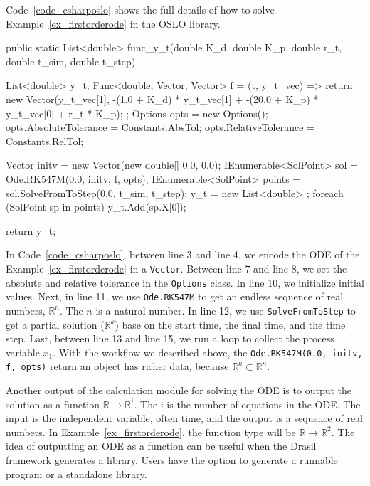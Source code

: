 Code~\ref{code_csharposlo} shows the full details of how to solve Example~\ref{ex_firstorderode} in the OSLO library.
\begin{listing}[ht]
\begin{csharp1}
public static List<double> func_y_t(double K_d, double K_p, double r_t, double t_sim, double t_step) {
    List<double> y_t;
    Func<double, Vector, Vector> f = (t, y_t_vec) => {
        return new Vector(y_t_vec[1], -(1.0 + K_d) * y_t_vec[1] + -(20.0 + K_p) * y_t_vec[0] + r_t * K_p);
    };
    Options opts = new Options();
    opts.AbsoluteTolerance = Constants.AbsTol;
    opts.RelativeTolerance = Constants.RelTol;
    
    Vector initv = new Vector(new double[] {0.0, 0.0});
    IEnumerable<SolPoint> sol = Ode.RK547M(0.0, initv, f, opts);
    IEnumerable<SolPoint> points = sol.SolveFromToStep(0.0, t_sim, t_step);
    y_t = new List<double> {};
    foreach (SolPoint sp in points) {
        y_t.Add(sp.X[0]);
    }
    
    return y_t;
}
\end{csharp1}
\label{code_csharposlo}
\end{listing}
In Code~\ref{code_csharposlo}, between line 3 and line 4, we encode the ODE of the Example~\ref{ex_firstorderode} in a \verb|Vector|. Between line 7 and line 8, we set the absolute and relative tolerance in the \verb|Options| class. In line 10, we initialize initial values. Next, in line 11, we use \verb|Ode.RK547M| to get an endless sequence of real numbers, $\mathbb{R}^n$. The $n$ is a natural number. In line 12, we use \verb|SolveFromToStep| to get a partial solution ($\mathbb{R}^k$) base on the start time, the final time, and the time step. Last, between line 13 and line 15, we run a loop to collect the process variable $x_1$. With the workflow we described above, the \verb|Ode.RK547M(0.0, initv, f, opts)| return an object has richer data, because {}$\mathbb{R}^k \subset \mathbb{R}^n$.

Another output of the calculation module for solving the ODE is to output the solution as a function $\mathbb{R} \rightarrow \mathbb{R}^i$. The i is the number of equations in the ODE. The input is the independent variable, often time, and the output is a sequence of real numbers. In Example~\ref{ex_firstorderode}, the function type will be $\mathbb{R} \rightarrow \mathbb{R}^2$. The idea of outputting an ODE as a function can be useful when the Drasil framework generates a library. Users have the option to generate a runnable program or a standalone library. 

